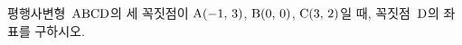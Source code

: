 평행사변형~$\mathrm{ABCD}$의 세 꼭짓점이 $\mathrm{A}(-1,\,3)$, $\mathrm{B}(0,\,0)$, $\mathrm{C}(3,\,2)$일 때, 꼭짓점~$\mathrm{D}$의 좌표를 구하시오.
